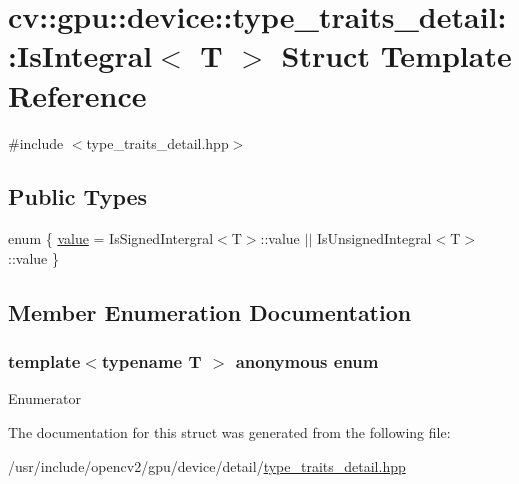 \hypertarget{structcv_1_1gpu_1_1device_1_1type__traits__detail_1_1IsIntegral}{\section{cv\-:\-:gpu\-:\-:device\-:\-:type\-\_\-traits\-\_\-detail\-:\-:Is\-Integral$<$ T $>$ Struct Template Reference}
\label{structcv_1_1gpu_1_1device_1_1type__traits__detail_1_1IsIntegral}
}


{\ttfamily \#include $<$type\-\_\-traits\-\_\-detail.\-hpp$>$}

\subsection*{Public Types}
\begin{DoxyCompactItemize}
\item 
enum \{ \hyperlink{structcv_1_1gpu_1_1device_1_1type__traits__detail_1_1IsIntegral_a42f3cb1013664fd6dcb47e063432a308a1c3ae744735354868cefe45c8659c67a}{value} = Is\-Signed\-Intergral$<$T$>$\-:\-:value $\vert$$\vert$ Is\-Unsigned\-Integral$<$T$>$\-:\-:value
 \}
\end{DoxyCompactItemize}


\subsection{Member Enumeration Documentation}
\hypertarget{structcv_1_1gpu_1_1device_1_1type__traits__detail_1_1IsIntegral_a42f3cb1013664fd6dcb47e063432a308}{\subsubsection[{anonymous enum}]{\setlength{\rightskip}{0pt plus 5cm}template$<$typename T $>$ anonymous enum}}\label{structcv_1_1gpu_1_1device_1_1type__traits__detail_1_1IsIntegral_a42f3cb1013664fd6dcb47e063432a308}
\begin{Desc}
\item[Enumerator]\par
\begin{description}
\item[{\em 
\hypertarget{structcv_1_1gpu_1_1device_1_1type__traits__detail_1_1IsIntegral_a42f3cb1013664fd6dcb47e063432a308a1c3ae744735354868cefe45c8659c67a}{value}\label{structcv_1_1gpu_1_1device_1_1type__traits__detail_1_1IsIntegral_a42f3cb1013664fd6dcb47e063432a308a1c3ae744735354868cefe45c8659c67a}
}]\end{description}
\end{Desc}


The documentation for this struct was generated from the following file\-:\begin{DoxyCompactItemize}
\item 
/usr/include/opencv2/gpu/device/detail/\hyperlink{type__traits__detail_8hpp}{type\-\_\-traits\-\_\-detail.\-hpp}\end{DoxyCompactItemize}
